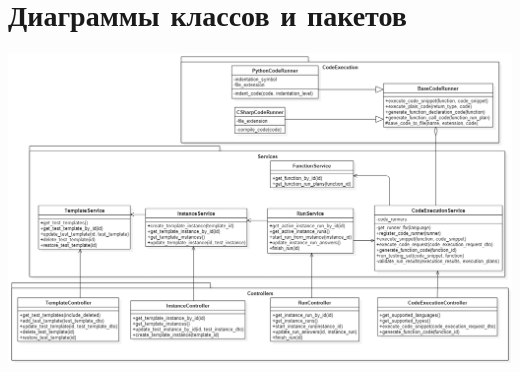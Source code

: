\documentclass{article}
\begin{document}
    \section{Диаграммы классов и пакетов}
    \includegraphics[width=\textwidth, keepaspectratio, angle=270,center]
    {ClassDiagram_Services}
    \pagebreak
\end{document}
